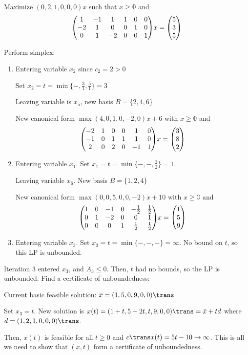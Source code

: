 \begin{example}
  Maximize $(0,2,1,0,0,0)x$ such that
  $x \geq \mathbb 0$ and
  \[\mqty(\mqty{1&-1&1\\-2&1&0\\0&1&-2}&\mqty{\imat{3}})x = \mqty(5\\3\\5)\]
\end{example}
\begin{sol}
  Perform simplex:
  \begin{enumerate}
    \item Entering variable $x_2$ since $c_2 = 2 > 0$

          Set $x_2 = t = \min\{-,\frac{3}{1},\frac{5}{1}\} = 3$

          Leaving variable is $x_5$, new basis $B = \{2,4,6\}$

          New canonical form $\max(4,0,1,0,-2,0)x + 6$ with
          $x \geq \mathbb 0$ and
          \[\mqty(-2&1&0&0&1&0\\-1&0&1&1&1&0\\2&0&2&0&-1&1)x = \mqty(3\\8\\2)\]

    \item Entering variable $x_1$.
          Set $x_1 = t = \min\{-,-,\frac{2}{2}\}=1$.

          Leaving variable $x_6$. New basis $B = \{1,2,4\}$

          New canonical form $\max(0,0,5,0,0,-2)x + 10$ with
          $x \geq \mathbb 0$ and
          \[\mqty(1&0&-1&0&-\frac12&\frac12\\0&1&-2&0&0&1\\0&0&0&1&\frac12&\frac12)x = \mqty(1\\5\\9)\]

    \item Entering variable $x_3$.
          Set $x_3 = t = \min\{-,-,-\} = \infty$.
          No bound on $t$, so this LP is unbounded.
  \end{enumerate}
  Iteration 3 entered $x_3$, and $A_3 \leq 0$.
  Then, $t$ had no bounds, so the LP is unbounded.
  Find a certificate of unboundedness:

  Current basic feasible solution: $\bar x = (1,5,0,9,0,0)\trans$

  Set $x_3 = t$.
  New solution is $x(t) = (1+t,5+2t,t,9,0,0)\trans = \bar x + td$
  where $d = (1,2,1,0,0,0)\trans$.

  Then, $x(t)$ is feasible for all $t \geq 0$ and
  $c\trans x(t) = 5t - 10 \to \infty$.
  This is all we need to show that $(\bar x, t)$
  form a certificate of unboundedness.
\end{sol}


